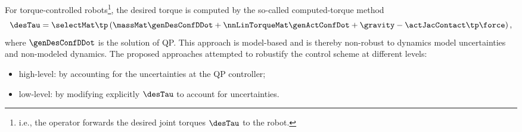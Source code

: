 For torque-controlled robots\footnote{i.e., the operator forwards  the desired joint torques $\desTau$ to the robot.}, the desired torque  is computed by the so-called computed-torque method~\cite{spong2020bookRobotModeling,siciliano2010robotics} 
\begin{equation}\label{eq-chap0:computed torque}
	\desTau = \selectMat\tp\left(\massMat\genDesConfDDot + \nnLinTorqueMat\genActConfDot + \gravity - {\actJacContact}\tp\force\right),
\end{equation}
where $\genDesConfDDot$ is the solution of QP. This approach is model-based and is thereby non-robust to dynamics model uncertainties and non-modeled dynamics. The proposed approaches attempted to robustify the control scheme at different levels:
\begin{itemize}
	\item high-level: by accounting for the uncertainties at the QP controller;
	\item low-level: by modifying explicitly $\desTau$ to account for uncertainties. 
\end{itemize}





